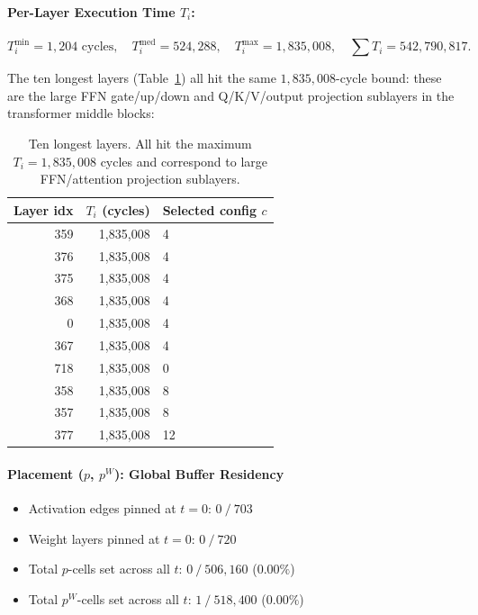 \paragraph{Per-Layer Execution Time $T_i$:}

\[ T_i^{\min} = 1{,}204 \text{ cycles}, \quad T_i^{\mathrm{med}} = 524{,}288, \quad T_i^{\max} = 1{,}835{,}008, \quad \textstyle\sum T_i = 542{,}790{,}817. \]

\noindent The ten longest layers (Table~\ref{tab:longest_layers}) all hit the same $1{,}835{,}008$-cycle bound: these are the large FFN gate/up/down and Q/K/V/output projection sublayers in the transformer middle blocks:

\begin{table}[h]
\centering
\caption{Ten longest layers. All hit the maximum $T_i =
1{,}835{,}008$ cycles and correspond to large FFN/attention
projection sublayers.}
\label{tab:longest_layers}
\begin{tabular}{rrl}
\toprule
\textbf{Layer idx} & \textbf{$T_i$ (cycles)} & \textbf{Selected config $c$} \\
\midrule
359 & 1{,}835{,}008 &  4 \\
376 & 1{,}835{,}008 &  4 \\
375 & 1{,}835{,}008 &  4 \\
368 & 1{,}835{,}008 &  4 \\
  0 & 1{,}835{,}008 &  4 \\
367 & 1{,}835{,}008 &  4 \\
718 & 1{,}835{,}008 &  0 \\
358 & 1{,}835{,}008 &  8 \\
357 & 1{,}835{,}008 &  8 \\
377 & 1{,}835{,}008 & 12 \\
\bottomrule
\end{tabular}
\end{table}

\paragraph{Placement ($p$, $p^W$): Global Buffer Residency}

\begin{itemize}[leftmargin=1.4em, itemsep=2pt]
    \item Activation edges pinned at $t=0$: $0\ /\ 703$
    \item Weight layers pinned at $t=0$: $0\ /\ 720$
    \item Total $p$-cells set across all $t$:
          $0\ /\ 506{,}160$ ($0.00\%$)
    \item Total $p^W$-cells set across all $t$:
          $1\ /\ 518{,}400$ ($0.00\%$)
\end{itemize}

